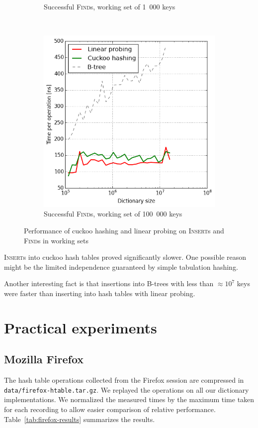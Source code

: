 \begin{figure}
\begin{subfigure}[t]{0.31\textwidth}
	\caption{Successful \textsc{Find}s, working set of 1~000 keys}
\end{subfigure}
~
\begin{subfigure}[t]{0.31\textwidth}
	\includegraphics[width=\textwidth]{img/performance/hashing-4}
	\caption{Successful \textsc{Find}s, working set of 100~000 keys}
\end{subfigure}
\caption{Performance of cuckoo hashing and linear probing on \textsc{Insert}s
	and \textsc{Find}s in working sets}
\label{fig:hashing-performance}
\end{figure}

\textsc{Insert}s into cuckoo hash tables proved significantly slower.
One possible reason might be the limited independence guaranteed by simple
tabulation hashing.

Another interesting fact is that insertions into \mbox{B-trees} with
less than $\approx10^7$ keys were faster than inserting into hash tables
with linear probing.  %

\section{Practical experiments}
\subsection{Mozilla Firefox}
The hash table operations collected from the Firefox session are compressed
in \texttt{data/firefox-htable.tar.gz}. We replayed the operations on all our
dictionary implementations. We normalized the measured times by the maximum
time taken for each recording to allow easier comparison of relative
performance. Table~\ref{tab:firefox-results} summarizes the results.

